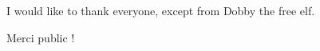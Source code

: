 

\vspace*{-5mm}
I would like to thank everyone, except from Dobby the free elf.

\begin{otherlanguage}{french}

Merci public !

\end{otherlanguage}
